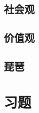 \documentclass[12pt]{book}
\begin{document}
\chapter{社会观}


\chapter{价值观}






\chapter{琵琶}\label{chapter:琵琶}




















\part{习题}
\end{document}
